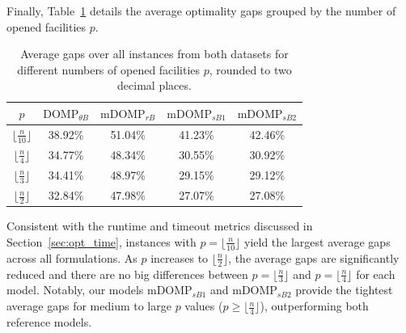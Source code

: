 \documentclass[letterpaper]{article}
\begin{document}
Finally, Table~\ref{tab:gaps_by_p} details the average optimality gaps grouped by the number of opened facilities $p$.
\begin{table}[ht]
    \centering
    \begin{tabular}{ccccc}
        \hline
        $p$ & $\text{DOMP}_{\theta B}$ & $\text{mDOMP}_{rB}$ & $\text{mDOMP}_{sB1}$ & $\text{mDOMP}_{sB2}$ \\
        \hline
        $\lfloor \frac{n}{10} \rfloor$ & 38.92\% & 51.04\% & 41.23\% & 42.46\% \\
        $\lfloor \frac{n}{4} \rfloor$ & 34.77\% & 48.34\% & 30.55\% & 30.92\% \\
        $\lfloor \frac{n}{3} \rfloor$ & 34.41\% & 48.97\% & 29.15\% & 29.12\% \\
        $\lfloor \frac{n}{2} \rfloor$ & 32.84\% & 47.98\% & 27.07\% & 27.08\% \\
        \hline
    \end{tabular}
    \caption{Average gaps over all instances from both datasets for different numbers of opened facilities $p$, rounded to two decimal places.}
    \label{tab:gaps_by_p}
\end{table}
Consistent with the runtime and timeout metrics discussed in Section~\ref{sec:opt_time}, instances with $p = \lfloor \frac{n}{10} \rfloor$ yield the largest average gaps across all formulations. As $p$ increases to $\lfloor \frac{n}{2} \rfloor$, the average gaps are significantly reduced and there are no big differences between $p = \lfloor \frac{n}{3} \rfloor$ and $p = \lfloor \frac{n}{4} \rfloor$ for each model. Notably, our models $\text{mDOMP}_{sB1}$ and $\text{mDOMP}_{sB2}$ provide the tightest average gaps for medium to large $p$ values ($p \geq \lfloor \frac{n}{4} \rfloor$), outperforming both reference models.
\end{document}

